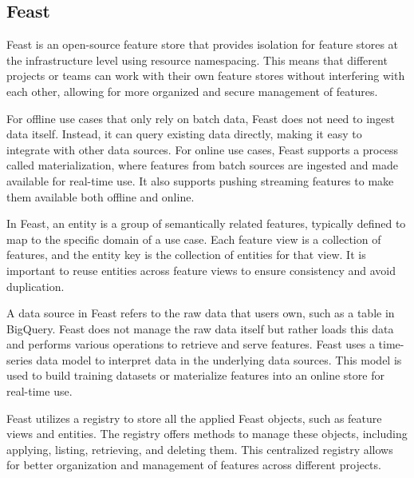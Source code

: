 \subsection{Feast}
Feast is an open-source feature store that provides isolation for feature stores at the infrastructure level using resource namespacing. 
This means that different projects or teams can work with their own feature stores without interfering with each other, allowing for more organized and secure management of features.

For offline use cases that only rely on batch data, Feast does not need to ingest data itself.
Instead, it can query existing data directly, making it easy to integrate with other data sources. 
For online use cases, Feast supports a process called materialization, where features from batch sources are ingested and made available for real-time use. 
It also supports pushing streaming features to make them available both offline and online.

In Feast, an entity is a group of semantically related features, typically defined to map to the specific domain of a use case. 
Each feature view is a collection of features, and the entity key is the collection of entities for that view. 
It is important to reuse entities across feature views to ensure consistency and avoid duplication.

A data source in Feast refers to the raw data that users own, such as a table in BigQuery. 
Feast does not manage the raw data itself but rather loads this data and performs various operations to retrieve and serve features. 
Feast uses a time-series data model to interpret data in the underlying data sources. This model is used to build training datasets or materialize features into an online store for real-time use.

Feast utilizes a registry to store all the applied Feast objects, such as feature views and entities.
The registry offers methods to manage these objects, including applying, listing, retrieving, and deleting them. 
This centralized registry allows for better organization and management of features across different projects.